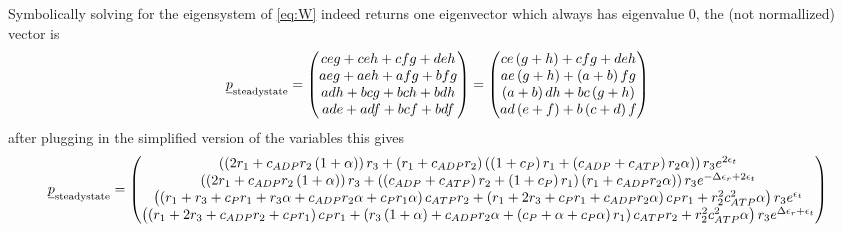 \documentclass[11pt]{article}
\newcommand{\suf}[2]{\stackunder[0.5pt]{\stackunder[1pt]{\ensuremath{#1}}{\rule{\widthof{\ensuremath{#2}}*\real{0.9}}{.1ex}}}{}}
\newcommand{\su}[1]{\suf{#1}{#1}}
\begin{document}
Symbolically solving for the eigensystem of \cref{eq:W} indeed returns one eigenvector which always has eigenvalue 0, the (not normallized) vector is
\begin{equation}
    \su{p}_\text{steadystate} = \begin{pmatrix}
        c e g + c e h + c f g + d e h \\
        a e g + a e h + a f g + b f g \\
        a d h + b c g + b c h + b d h \\
        a d e + a d f + b c f + b d f
    \end{pmatrix} = \begin{pmatrix}
        c e \left( g + h \right) + c f g + d e h \\
        a e \left( g + h \right) + \left( a + b \right) f g \\
        \left( a + b \right) d h + b c \left( g + h \right) \\
        a d \left( e + f \right) + b \left( c + d \right) f
    \end{pmatrix}
\end{equation}
after plugging in the simplified version of the variables this gives
\footnotesize
\begin{equation}
    \su{p}_\text{steadystate} = \begin{pmatrix}
        \left( \left( 2 r_1 + c_{ADP} r_2 \left( 1 + \alpha \right) \right) r_3 + \left( r_1 + c_{ADP} r_2 \right) \left( \left( 1 + c_P \right) r_1 + \left( c_{ADP} + c_{ATP} \right) r_2 \alpha \right) \right) r_3 e^{2 \epsilon_{t}} \\
        \left( \left( 2 r_1 + c_{ADP} r_2 \left( 1 + \alpha \right) \right) r_3 + \left( \left( c_{ADP} + c_{ATP} \right) r_2 + \left( 1 + c_P \right) r_1 \right) \left( r_1 + c_{ADP} r_2 \alpha \right) \right) r_3 e^{ - \Delta\epsilon_{r} + 2 \epsilon_{t}} \\
        \left( \left( r_1 + r_3 + c_P r_1 + r_3 \alpha + c_{ADP} r_2 \alpha + c_P r_1 \alpha \right) c_{ATP} r_2 + \left( r_1 + 2 r_3 + c_P r_1 + c_{ADP} r_2 \alpha \right) c_P r_1 + r_2^{2} c_{ATP}^{2} \alpha \right) r_3 e^{\epsilon_{t}} \\
        \left( \left( r_1 + 2 r_3 + c_{ADP} r_2 + c_P r_1 \right) c_P r_1 + \left( r_3 \left( 1 + \alpha \right) + c_{ADP} r_2 \alpha + \left( c_P + \alpha + c_P \alpha \right) r_1 \right) c_{ATP} r_2 + r_2^{2} c_{ATP}^{2} \alpha \right) r_3 e^{\Delta\epsilon_{r} + \epsilon_{t}}
    \end{pmatrix}
\end{equation}
\normalsize
\end{document}
